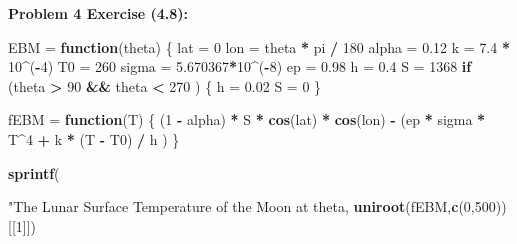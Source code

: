 \documentclass[11pt]{article}
\newenvironment{problem}[1]{\textbf{Problem #1: }}{\newpage}
\newenvironment{Shaded}{\begin{snugshade}}{\end{snugshade}}
\newcommand{\ControlFlowTok}[1]{\textcolor[rgb]{0.13,0.29,0.53}{\textbf{#1}}}
\newcommand{\DecValTok}[1]{\textcolor[rgb]{0.00,0.00,0.81}{#1}}
\newcommand{\FloatTok}[1]{\textcolor[rgb]{0.00,0.00,0.81}{#1}}
\newcommand{\KeywordTok}[1]{\textcolor[rgb]{0.13,0.29,0.53}{\textbf{#1}}}
\newcommand{\NormalTok}[1]{#1}
\newcommand{\OperatorTok}[1]{\textcolor[rgb]{0.81,0.36,0.00}{\textbf{#1}}}
\newcommand{\StringTok}[1]{\textcolor[rgb]{0.31,0.60,0.02}{#1}}
\begin{document}
\begin{problem}{4 Exercise (4.8)}
\begin{Shaded}
\begin{Highlighting}[]
\NormalTok{EBM =}\StringTok{ }\ControlFlowTok{function}\NormalTok{(theta) \{}
\NormalTok{  lat =}\StringTok{ }\DecValTok{0}
\NormalTok{  lon =}\StringTok{ }\NormalTok{theta }\OperatorTok{*}\StringTok{ }\NormalTok{pi }\OperatorTok{/}\StringTok{ }\DecValTok{180}
\NormalTok{  alpha =}\StringTok{ }\FloatTok{0.12}
\NormalTok{  k =}\StringTok{ }\FloatTok{7.4} \OperatorTok{*}\StringTok{ }\DecValTok{10}\OperatorTok{^}\NormalTok{(}\OperatorTok{-}\DecValTok{4}\NormalTok{)}
\NormalTok{  T0 =}\StringTok{ }\DecValTok{260}
\NormalTok{  sigma =}\StringTok{ }\FloatTok{5.670367}\OperatorTok{*}\DecValTok{10}\OperatorTok{^}\NormalTok{(}\OperatorTok{-}\DecValTok{8}\NormalTok{)}
\NormalTok{  ep =}\StringTok{ }\FloatTok{0.98}
\NormalTok{  h =}\StringTok{ }\FloatTok{0.4}
\NormalTok{  S =}\StringTok{ }\DecValTok{1368}
  \ControlFlowTok{if}\NormalTok{ (theta }\OperatorTok{>}\StringTok{ }\DecValTok{90} \OperatorTok{&&}\StringTok{ }\NormalTok{theta }\OperatorTok{<}\StringTok{ }\DecValTok{270}\NormalTok{ ) \{}
\NormalTok{    h =}\StringTok{ }\FloatTok{0.02}
\NormalTok{    S =}\StringTok{ }\DecValTok{0}
\NormalTok{  \}}

\NormalTok{  fEBM =}\StringTok{ }\ControlFlowTok{function}\NormalTok{(T) \{ (}\DecValTok{1} \OperatorTok{-}\StringTok{ }\NormalTok{alpha) }\OperatorTok{*}\StringTok{ }\NormalTok{S }\OperatorTok{*}\StringTok{ }\KeywordTok{cos}\NormalTok{(lat) }\OperatorTok{*}\StringTok{ }\KeywordTok{cos}\NormalTok{(lon) }\OperatorTok{-}\StringTok{ }
\StringTok{                     }\NormalTok{(ep }\OperatorTok{*}\StringTok{ }\NormalTok{sigma }\OperatorTok{*}\StringTok{ }\NormalTok{T}\OperatorTok{^}\DecValTok{4} \OperatorTok{+}\StringTok{ }\NormalTok{k }\OperatorTok{*}\StringTok{ }\NormalTok{(T }\OperatorTok{-}\StringTok{ }\NormalTok{T0) }\OperatorTok{/}\StringTok{ }\NormalTok{h ) \}}

  \KeywordTok{sprintf}\NormalTok{(}\StringTok{"The Lunar Surface Temperature of the Moon at %
\NormalTok{          theta, }\KeywordTok{uniroot}\NormalTok{(fEBM,}\KeywordTok{c}\NormalTok{(}\DecValTok{0}\NormalTok{,}\DecValTok{500}\NormalTok{))[[}\DecValTok{1}\NormalTok{]])}

}
\end{Highlighting}
\end{Shaded}
\end{problem}
\end{document}
